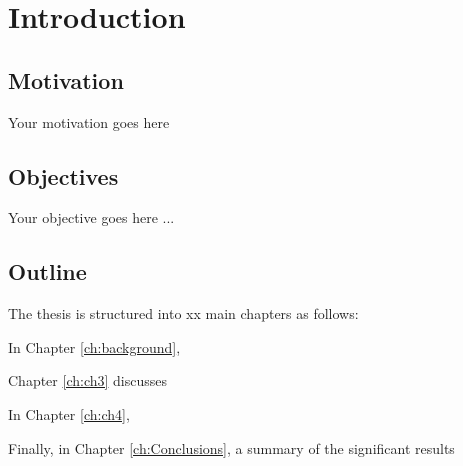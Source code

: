\chapter{Introduction}\label{ch:Intro}
  \section{Motivation}\label{sec:Motivation}
    Your motivation goes here

  \section{Objectives}\label{sec:thesisObjective}
    Your objective goes here ...  
    
  \section{Outline}\label{sec:thesisOutline}
    The thesis is structured into xx main chapters as follows:
    
    In Chapter \ref{ch:background}, 
    
    Chapter \ref{ch:ch3} discusses 
    
    In Chapter \ref{ch:ch4}, 
    
    
    Finally, in Chapter \ref{ch:Conclusions}, a summary of the significant results 